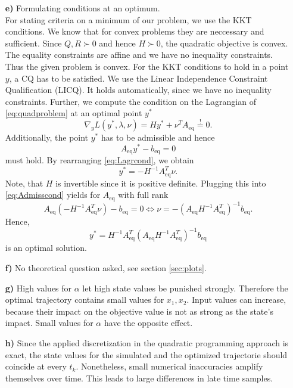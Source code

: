 \documentclass[]{article}
\newcommand{\yopt}{y^*}
\newcommand{\todo}{{\color{red} TODO!}}
\newcommand{\ind}[2]{{#1}_{\mathrm{#2}}}
\newcommand{\trp}{^T}
\newcommand{\xone}{x_1}
\newcommand{\xtwo}{x_2}
\newcommand{\Aeq}{\ind{A}{eq}}
\newcommand{\beq}{\ind{b}{eq}}
\newcommand{\grad}{\nabla}
\newcommand{\inv}{^{-1}}
\begin{document}
\begin{enumerate}
\item[\bf e)] Formulating  conditions at an optimum.\\
For stating criteria on a minimum of our problem, we use the KKT conditions.
We know that for convex problems they are neccessary and sufficient. Since $ Q,R \succ 0$ and hence $ H \succ 0 $, the quadratic objective is convex. The equality constraints are affine and we have no inequality constraints. Thus the given problem is convex. For the KKT conditions to hold in a point $ y$, a CQ has to be satisfied. We use the Linear Independence Constraint Qualification (LICQ).
It holds automatically, since we have no inequality constraints. 
Further, we compute the condition on the Lagrangian of \eqref{eq:quadproblem} at an optimal point $ \yopt $
\begin{equation}
	\grad_y	L(\yopt,\lambda,\nu) = H\yopt + \nu \trp \Aeq \overset{!}{=} 0. \label{eq:Lagrcond}
\end{equation}
Additionally, the point $ \yopt $ has to be admissible and hence \begin{equation}
	\Aeq \yopt - \beq = 0 \label{eq:Admisscond}
\end{equation}
must hold.
By rearranging \eqref{eq:Lagrcond}, we obtain
\[ \yopt = - H\inv\Aeq \trp \nu. \]
Note, that $ H $ is invertible since it is positive definite.
Plugging this into \eqref{eq:Admisscond} yields for $ \Aeq $ with full rank
\[  \Aeq (-H\inv \Aeq \trp \nu) -\beq = 0 \Longleftrightarrow \nu = -(\Aeq H\inv \Aeq\trp)\inv \beq.\]
Hence, \[ \yopt = H\inv \Aeq\trp (\Aeq H\inv \Aeq\trp)\inv \beq \] is an optimal solution.\\


\item[\bf f)] No theoretical question asked, see section \ref{sec:plots}.
\item[\bf g)] High values for $ \alpha $ let high state values be punished strongly. Therefore the optimal trajectory contains small values for $ \xone,\xtwo $.  Input values can increase, because their impact on the objective value is not as strong as the state's impact. Small values for $ \alpha $ have the opposite effect. 

\item[\bf h)] Since the applied discretization in the quadratic programming approach is exact, the state values for the simulated and the optimized trajectorie should coincide at every $ t_k $. Nonetheless, small numerical inaccuracies amplify themselves over time. This leads to large differences in late time samples.
\end{enumerate}
\end{document}
